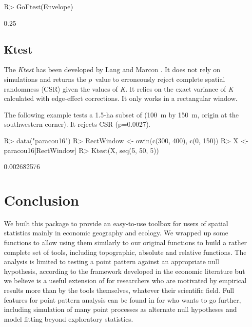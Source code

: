 \documentclass[nojss]{jss}
\begin{document}
\begin{Schunk}
\begin{Sinput}
R> GoFtest(Envelope)
\end{Sinput}
\begin{Soutput}
[1] 0.25
\end{Soutput}
\end{Schunk}

\subsection{Ktest}
The \emph{Ktest} has been developed by Lang and Marcon \citep{Lang2010, Marcon2013}. It does not rely on simulations and returns the $p$~value to erroneously reject complete spatial randomness (CSR) given the values of \emph{K}. It relies on the exact variance of \emph{K} calculated with edge-effect corrections. It only works in a rectangular window.

The following example tests a 1.5-ha subset of  (100~m by 150~m, origin at the southwestern corner). It rejects CSR (p=0.0027).

\begin{Schunk}
\begin{Sinput}
R> data("paracou16")
R> RectWindow <- owin(c(300, 400), c(0, 150))
R> X <- paracou16[RectWindow]
R> Ktest(X, seq(5, 50, 5))
\end{Sinput}
\begin{Soutput}
[1] 0.002682576
\end{Soutput}
\end{Schunk}


\section{Conclusion}

We built this package to provide an easy-to-use toolbox for users of spatial statistics mainly in economic geography and ecology. We wrapped up some  functions to allow using them similarly to our original functions to build a rather complete set of tools, including topographic, absolute and relative functions. The analysis is limited to testing a point pattern against an appropriate null hypothesis, according to the framework developed in the economic literature \citep{Combes2008} but we believe  is a useful extension of  for researchers who are motivated by empirical results more than by the tools themselves, whatever their scientific field. 
Full features for point pattern analysis can be found in  for who wants to go further, including simulation of many point processes as alternate null hypotheses and model fitting beyond exploratory statistics.
\end{document}
